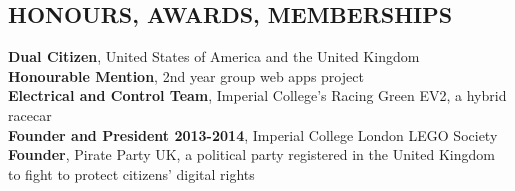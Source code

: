 \documentclass[line,margin]{res}
\begin{document}
\begin{resume}
               
\section{HONOURS, AWARDS, MEMBERSHIPS} 
				\textbf{Dual Citizen}, United States of America and the United Kingdom \\
				\textbf{Honourable Mention}, 2nd year group web apps project \\
				\textbf{Electrical and Control Team}, Imperial College's Racing Green EV2, a hybrid racecar \\
				\textbf{Founder and President 2013-2014}, Imperial College London LEGO Society \\
                \textbf{Founder}, Pirate Party UK, a political party registered in the United Kingdom to fight to protect citizens' digital rights 
\end{resume}
\end{document}
